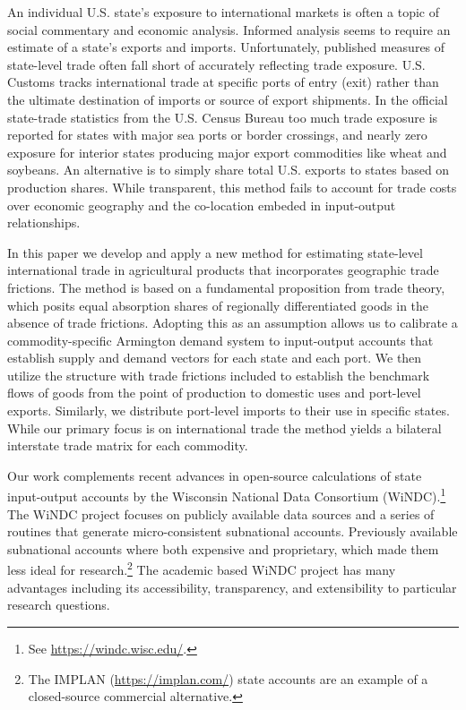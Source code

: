 \documentclass{ejb}
\begin{document}
An individual U.S. state's exposure to international markets is often
a topic of social commentary and economic analysis.  Informed
analysis seems to require an estimate of a state's exports and
imports.  Unfortunately, published measures of state-level trade often
fall short of accurately reflecting trade exposure.  U.S. Customs
tracks international trade at specific ports of entry (exit) rather
than the ultimate destination of imports or source of export
shipments. In the official state-trade statistics from the U.S. Census
Bureau too much trade exposure is reported for states with major sea
ports or border crossings, and nearly zero exposure for interior
states producing major export commodities like wheat and soybeans.  An
alternative is to simply share total U.S. exports to states based on
production shares.  While transparent, this method fails to account
for trade costs over economic geography and the co-location embeded in
input-output relationships. 

In this paper we develop and apply a new method for estimating
state-level international trade in agricultural products that
incorporates geographic trade frictions.  The method
is based on a fundamental proposition from trade theory, which posits
equal absorption shares of regionally differentiated goods in the
absence of trade frictions.  Adopting this as an assumption allows us
to calibrate a commodity-specific Armington demand system to
input-output accounts that establish supply and demand vectors for
each state and each port. We then utilize the structure with trade
frictions included to establish the benchmark flows of goods from the
point of production to domestic uses and port-level exports.
Similarly, we distribute port-level imports to their use in specific
states.  While our primary focus is on international trade the method
yields a bilateral interstate trade matrix for each commodity.

Our work complements recent advances in open-source calculations
of state input-output accounts by the Wisconsin National Data
Consortium (WiNDC).\footnote{See \url{https://windc.wisc.edu/}.}
The WiNDC project focuses on publicly available data sources and a
series of routines that generate micro-consistent subnational
accounts.  Previously available subnational accounts where both
expensive and proprietary, which made them less ideal for
research.\footnote{The IMPLAN (\url{https://implan.com/}) state
	accounts are an example of a closed-source commercial
	alternative.}
The academic based WiNDC project has many advantages including its
accessibility, transparency, and extensibility to particular research
questions.  
\end{document}
